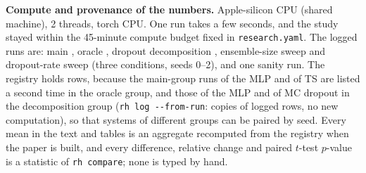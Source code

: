 \textbf{Compute and provenance of the numbers.} Apple-silicon CPU (shared machine), 2 threads, torch CPU. One run takes a few seconds, and the study stayed within the 45-minute compute budget fixed in \texttt{research.yaml}. The logged runs are: main , oracle , dropout decomposition , ensemble-size sweep  and dropout-rate sweep  (three conditions, seeds 0--2), and one sanity run. The registry holds  rows, because the main-group runs of the MLP and of TS are listed a second time in the oracle group, and those of the MLP and of MC dropout in the decomposition group (\texttt{rh log -{}-from-run}: copies of logged rows, no new computation), so that systems of different groups can be paired by seed. Every mean in the text and tables is an aggregate recomputed from the registry when the paper is built, and every difference, relative change and paired $t$-test $p$-value is a statistic of \texttt{rh compare}; none is typed by hand.
